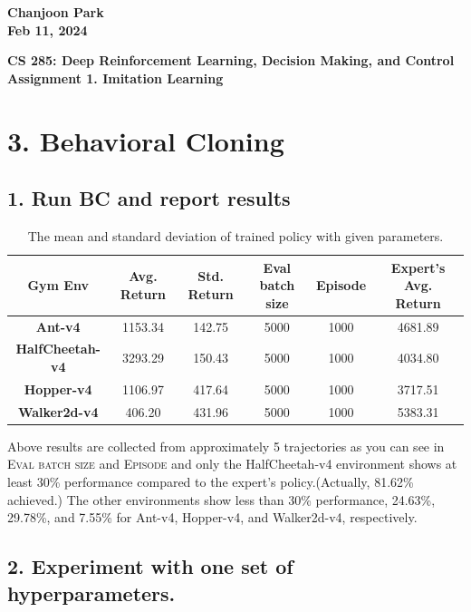 \documentclass{article}%
\begin{document}
\begin{flushright}
\textbf{Chanjoon Park \\
Feb 11, 2024}
\end{flushright}

\begin{center}
\textbf{CS 285: Deep Reinforcement Learning, Decision Making, and Control \\
Assignment 1. Imitation Learning \\}
\end{center}

\section*{3. Behavioral Cloning}

\subsection*{1. Run BC and report results}

\begin{table}[h!]
	\centering
	\begin{tabular}{ |c||c|c|c|c|c|  }
	\hline
	\textbf{Gym Env}&Avg. Return&Std. Return&Eval batch size&Episode&Expert's Avg. Return\\
	\hline
	\textbf{Ant-v4}& 1153.34& 142.75&  5000&1000&4681.89\\
	\textbf{HalfCheetah-v4}&3293.29& 150.43&5000&1000&4034.80\\
	\textbf{Hopper-v4}&1106.97& 417.64&5000&1000&3717.51\\
	\textbf{Walker2d-v4}&406.20& 431.96&5000&1000&5383.31\\
	\hline
 \end{tabular}
 \caption{The mean and standard deviation of trained policy with given parameters.}
 \label{Table:1}
\end{table}

Above results are collected from approximately 5 trajectories as you can see in \textsc{\textrm{Eval batch size}} and \textsc{\textrm{Episode}} and only the HalfCheetah-v4 environment shows at least 30\% performance compared to the expert's policy.(Actually, 81.62\% achieved.) The other environments show less than 30\% performance, 24.63\%, 29.78\%, and 7.55\% for Ant-v4, Hopper-v4, and Walker2d-v4, respectively.

\subsection*{2. Experiment with one set of hyperparameters.}
\end{document}
